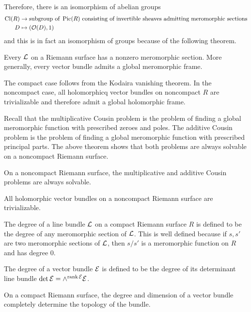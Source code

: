 \documentclass[12pt]{article}
\begin{document}
Therefore, there is an isomorphism of abelian groups \begin{align*}
    \operatorname{Cl}(R) & \to \text{subgroup of } \operatorname{Pic}(R) \text{ consisting of invertible sheaves admitting meromorphic sections} \\
    D & \mapsto (\mathcal{O}(D), 1)
\end{align*} and this is in fact an isomorphism of groups because of the following theorem.

\begin{theorem}
    Every ${\mathcal{L}}$ on a Riemann surface has a nonzero meromorphic section. More generally, every vector bundle admits a global meromorphic frame.
\end{theorem}
\begin{remark}
    The compact case follows from the Kodaira vanishing theorem. In the noncompact case, all holomorphicq vector bundles on noncompact $R$ are trivializable and therefore admit a global holomorphic frame.
\end{remark}

Recall that the multiplicative Cousin problem is the problem of finding a global meromorphic function with prescribed zeroes and poles. The additive Cousin problem is the problem of finding a global meromorphic function with prescribed principal parts. The above theorem shows that both problems are always solvable on a noncompact Riemann surface.
\begin{theorem}
    On a noncompact Riemann surface, the multiplicative and additive Cousin problems are always solvable.

    All holomorphic vector bundles on a noncompact Riemann surface are trivializable.
\end{theorem}

\begin{definition}
     The degree of a line bundle ${\mathcal{L}}$ on a compact Riemann surface $R$ is defined to be the degree of any meromorphic section of ${\mathcal{L}}$. This is well defined because if $s,s'$ are two meromorphic sections of ${\mathcal{L}}$, then $s/s'$ is a meromorphic function on $R$ and has degree $0$.

    The degree of a vector bundle ${\mathcal{E}}$ is defined to be the degree of its determinant line bundle $\det {\mathcal{E}} = \wedge^{\operatorname{rank} {\mathcal{E}}} {\mathcal{E}}$.
\end{definition}

\begin{fact}
On a compact Riemann surface, the degree and dimension of a vector bundle completely determine the topology of the bundle.
\end{fact}
\end{document}
